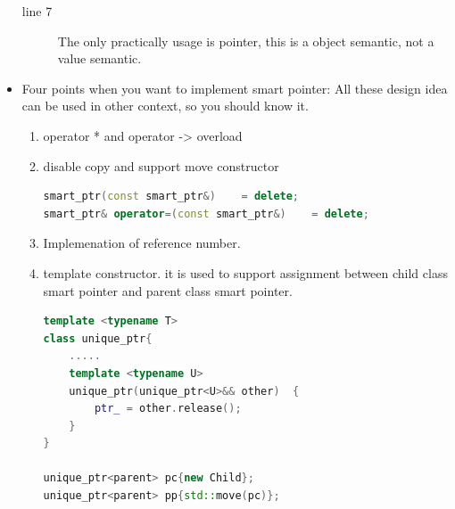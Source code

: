 \documentclass[a4paper,11pt,twoside]{book}
\begin{document}
\begin{itemize}
\begin{description}
	\item[line 7] The only practically usage is pointer, this is a object semantic, not a value semantic.  
\end{description}

	\item Four points when you want to implement smart pointer: All these design idea can be used in other context, so you should know it. 

	\begin{enumerate}
		\item operator * and operator -> overload
		\item disable copy and support move constructor
\begin{lstlisting}[frame=single, language=c++, mathescape=true]
smart_ptr(const smart_ptr&)    = delete;  
smart_ptr& operator=(const smart_ptr&)    = delete;
\end{lstlisting}

		\item Implemenation of reference number. 
		
		\item template constructor. it is used to support assignment between child class smart pointer and parent class smart pointer.
		
\begin{lstlisting}[frame=single, language=c++, mathescape=true]
template <typename T>
class unique_ptr{
	.....
	template <typename U>  
	unique_ptr(unique_ptr<U>&& other)  {
		ptr_ = other.release();  
	}
}

unique_ptr<parent> pc{new Child};
unique_ptr<parent> pp{std::move(pc)};
\end{lstlisting}

	\end{enumerate}

\end{itemize}
\end{document}

